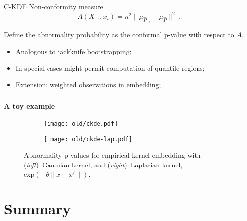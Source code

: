 \documentclass[t]{beamer}  %
\begin{document}
\begin{frame}[c]\frametitle{\insertsection}
  \framesubtitle{\insertsubsection}
  \begin{block}{C-KDE}
    Non-conformity measure
    $$ A(X_{-i}, x_i) = n^2 \| \mu_{\hat{P}_{-i}} - \mu_{\hat{P}} \|^2 \,. $$

    Define the abnormality probability as the conformal p-value with respect to $A$.

    \begin{itemize}
      \item Analogous to jackknife bootstrapping;
      \item In special cases might permit computation of quantile regions;
      \item Extension: weighted observations in embedding;
    \end{itemize}
  \end{block}
\end{frame}

\begin{frame}[c]\frametitle{\insertsection}
  \framesubtitle{A toy example}
  \begin{figure}%
    \centering
    \begin{subfigure}[b]{0.45\linewidth}
      \texttt{[image: old/ckde.pdf]}
    \end{subfigure}%
    \begin{subfigure}[b]{0.45\linewidth}
      \texttt{[image: old/ckde-lap.pdf]}
    \end{subfigure}%
    \caption{Abnormality p-values for empirical kernel embedding with
    (\textit{left})~Gaussian kernel, and
    (\textit{right})~Laplacian kernel, $\text{exp}(-\theta\|x-x'\|)$.}
    \label{fig:ckde}
  \end{figure}
\end{frame}



\section{Summary} %
\label{sec:summary}
\end{document}
